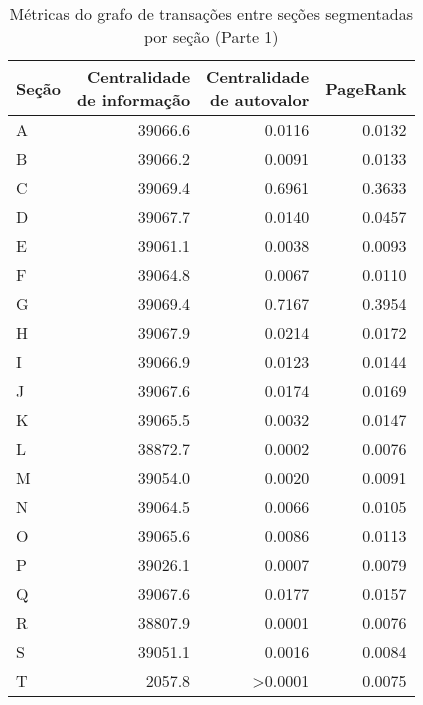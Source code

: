 \begin{table}[htb]
\centering
\caption{Métricas do grafo de transações entre seções segmentadas por seção (Parte 1)}
\label{tab:metricas-redes:grafo-por-secao-especificas1}
    \begin{tabular}{l|rrr}
    \toprule
    Seção &  \shortstack{Centralidade\\de informação} &  \shortstack{Centralidade\\de autovalor} &  PageRank \\
    \midrule
    A &              39066.6 &                  0.0116 &    0.0132 \\
    B &              39066.2 &                  0.0091 &    0.0133 \\
    C &              39069.4 &                  0.6961 &    0.3633 \\
    D &              39067.7 &                  0.0140 &    0.0457 \\
    E &              39061.1 &                  0.0038 &    0.0093 \\
    F &              39064.8 &                  0.0067 &    0.0110 \\
    G &              39069.4 &                  0.7167 &    0.3954 \\
    H &              39067.9 &                  0.0214 &    0.0172 \\
    I &              39066.9 &                  0.0123 &    0.0144 \\
    J &              39067.6 &                  0.0174 &    0.0169 \\
    K &              39065.5 &                  0.0032 &    0.0147 \\
    L &              38872.7 &                  0.0002 &    0.0076 \\
    M &              39054.0 &                  0.0020 &    0.0091 \\
    N &              39064.5 &                  0.0066 &    0.0105 \\
    O &              39065.6 &                  0.0086 &    0.0113 \\
    P &              39026.1 &                  0.0007 &    0.0079 \\
    Q &              39067.6 &                  0.0177 &    0.0157 \\
    R &              38807.9 &                  0.0001 &    0.0076 \\
    S &              39051.1 &                  0.0016 &    0.0084 \\
    T &               2057.8 &                  >0.0001 &    0.0075 \\
    \bottomrule
    \end{tabular}
\fdadospesquisa
\end{table}

